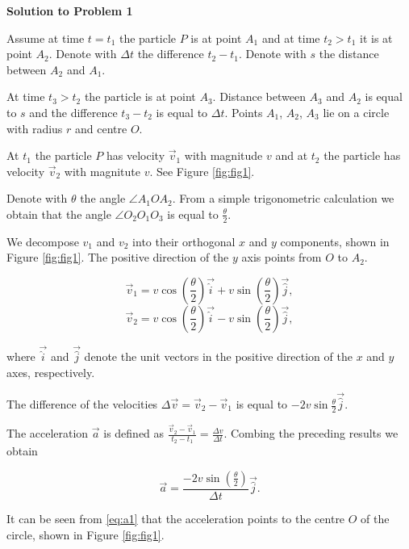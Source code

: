 \documentclass{article}
\begin{document}
{\bf Solution to Problem 1}

Assume at time $t=t_{1}$ the particle $P$ is at point $A_{1}$ and at time $t_{2}>t_{1}$ it is at point $A_{2}$. Denote with $\Delta t$ the difference $t_2-t_1$. Denote with $s$ the distance between $A_2$ and $A_1$.

At time $t_{3}>t_{2}$ the particle is at point $A_3$. Distance between $A_3$ and $A_2$ is equal to $s$ and the difference $t_3-t_2$ is equal to $\Delta t$. Points $A_1$, $A_2$, $A_3$ lie on a circle with radius $r$ and centre $O$.

At $t_{1}$ the particle $P$ has velocity $\vec{v}_1$ with magnitude $v$ and at $t_2$ the particle has velocity $\vec{v}_{2}$ with magnitute $v$. See Figure \ref{fig:fig1}.

Denote with $\theta$ the angle $\angle A_1OA_2$. From a simple trigonometric calculation we obtain that the angle $\angle O_2O_1O_3$ is equal to $\frac{\theta}{2}$. 

We decompose $v_{1}$ and $v_{2}$ into their orthogonal $x$ and $y$ components, shown in Figure \ref{fig:fig1}. The positive direction of the $y$ axis points from $O$ to $A_2$.


\begin{equation}
\vec{v}_1=v\cos\left( \frac{\theta}{2} \right) \vec{\hat{i}}+v\sin\left(\frac{\theta}{2}\right)\vec{\hat{j}}, 
\end{equation}
\begin{equation}
\vec{v}_2=v\cos\left( \frac{\theta}{2} \right) \vec{\hat{i}}-v\sin\left(\frac{\theta}{2}\right)\vec{\hat{j}}, 
\end{equation}

where $\vec{\hat{i}}$ and $\vec{\hat{j}}$ denote the unit vectors in the positive direction of the $x$ and $y$ axes, respectively.

The difference of the velocities $\Delta \vec{v}=\vec{v}_2-\vec{v}_1$ is equal to $-2v\sin{\frac{\theta}{2}}\vec{\hat{j}}$.

The acceleration $\vec{a}$ is defined as $\frac{\vec{v}_2-\vec{v}_1}{t_2-t_1}=\frac{\Delta v}{\Delta t}$. Combing the preceding results we obtain

\begin{equation}
  \vec{a}=\frac{-2v\sin\left(\frac{\theta}{2}\right)}{\Delta t}\vec{\hat{j}}.
  \label{eq:a1}
\end{equation}

It can be seen from \eqref{eq:a1} that the acceleration points to the centre $O$ of the circle, shown in Figure \ref{fig:fig1}.
\end{document}
